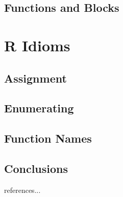 \begin{bibunit}
\subsection{Functions and Blocks}

\section{R Idioms}


\subsection{Assignment}

\subsection{Enumerating}

\subsection{Function Names}


\subsection{Conclusions}

references...

\renewcommand{\bibsection}{\section{\bibname}}
\putbib
\end{bibunit}
